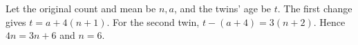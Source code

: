 Let the original count and mean be $n,a$, and the twins' age be $t$. The first change gives $t=a+4(n+1)$. For the second twin, $t-(a+4)=3(n+2)$. Hence $4n=3n+6$ and $\boxed{n=6}$.
